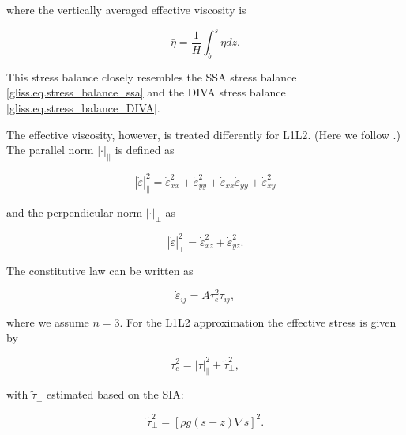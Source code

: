 {\noindent
where the vertically averaged effective viscosity is

\begin{equation}
  \bar{\eta} = \frac{1}{H} \int_b^s {\eta dz}.
\end{equation}

\noindent
This stress balance closely resembles the SSA stress balance \eqref{gliss.eq.stress_balance_ssa}
and the DIVA stress balance \eqref{gliss.eq.stress_balance_DIVA}.

The effective viscosity, however, is treated differently for L1L2.
(Here we follow \citet{Perego2012}.)
The parallel norm $\left| \cdot \right|_{||}$ is defined as

\begin{equation}
  \label{gliss.eq.L1L2_parallel_norm}
  \left| {\dot{\varepsilon }} \right|_{\parallel}^{2} = 
  \dot{\varepsilon }_{xx}^{2} + \dot{\varepsilon }_{yy}^{2} + {{\dot{\varepsilon }}_{xx}}{{\dot{\varepsilon }}_{yy}} + \dot{\varepsilon }_{xy}^{2}
\end{equation}

\noindent
and the perpendicular norm $\left| \cdot \right|_{\perp}$ as

\begin{equation}
  \label{gliss.eq.L1L2_perp_norm}
  \left| {\dot{\varepsilon }} \right|_{\perp}^{2} = 
  \dot{\varepsilon }_{xz}^{2} + \dot{\varepsilon }_{yz}^{2}.
\end{equation}

\noindent
The constitutive law can be written as 

\begin{equation}
  \label{gliss.eq.L1L2_constitutive}
  {{\dot{\varepsilon }}_{ij}} = A \tau _{e}^{2} {{\tau }_{ij}},
\end{equation}

\noindent
where we assume $n=3$.  For the L1L2 approximation the effective stress is given by

\begin{equation}
  \label{gliss.eq.L1L2_tau_effective}
  \tau _{e}^{2} = \left| \tau  \right|_{\parallel }^{2} + \tilde{\tau}_{\perp}^2,
\end{equation}

\noindent
with $\tilde{\tau}_{\perp}$ estimated based on the SIA:

\begin{equation}
  \label{gliss.eq.L1L2_tau_perp}
  \tilde{\tau}_{\perp}^{2} = {\left[ \rho g(s-z)\nabla s \right]}^2.
\end{equation}

}
